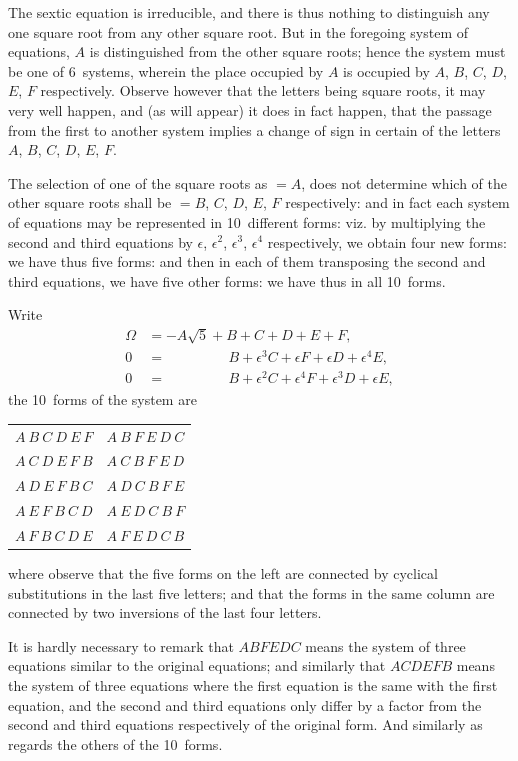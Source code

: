 \documentclass[11pt,a4paper]{book}
\begin{document}
The sextic equation is irreducible, and there is thus nothing to distinguish any one square root from any other square root. But in the foregoing system of equations, $A$ is distinguished from the other square roots; hence the system must be one of 6~systems, wherein the place occupied by $A$ is occupied by $A$, $B$, $C$, $D$, $E$, $F$ respectively. Observe however that the letters being square roots, it may very well happen, and (as will appear) it does in fact happen, that the passage from the first to another system implies a change of sign in certain of the letters $A$, $B$, $C$, $D$, $E$, $F$.

The selection of one of the square roots as $= A$, does not determine which of the other square roots shall be $= B$, $C$, $D$, $E$, $F$ respectively: and in fact each system of equations may be represented in 10~different forms: viz. by multiplying the second and third equations by $\epsilon$, $\epsilon^2$, $\epsilon^3$, $\epsilon^4$ respectively, we obtain four new forms: we have thus five forms: and then in each of them transposing the second and third equations, we have five other forms: we have thus in all 10~forms.

Write
\begin{align*}
\Omega &= -A\sqrt{5} + B + C + D + E + F, \\
0 &= \phantom{-A\sqrt{5} +}\, B + \epsilon^3 C + \epsilon F + \epsilon D + \epsilon^4 E, \\
0 &= \phantom{-A\sqrt{5} +}\, B + \epsilon^2 C + \epsilon^4 F + \epsilon^3 D + \epsilon E,
\end{align*}
the 10~forms of the system are
\begin{center}
\begin{tabular}{l|l}
$A\ B\ C\ D\ E\ F$ & $A\ B\ F\ E\ D\ C$ \\
$A\ C\ D\ E\ F\ B$ & $A\ C\ B\ F\ E\ D$ \\
$A\ D\ E\ F\ B\ C$ & $A\ D\ C\ B\ F\ E$ \\
$A\ E\ F\ B\ C\ D$ & $A\ E\ D\ C\ B\ F$ \\
$A\ F\ B\ C\ D\ E$ & $A\ F\ E\ D\ C\ B$
\end{tabular}
\end{center}
where observe that the five forms on the left are connected by cyclical substitutions in the last five letters; and that the forms in the same column are connected by two inversions of the last four letters.

It is hardly necessary to remark that $ABFEDC$ means the system of three equations similar to the original equations; and similarly that $ACDEFB$ means the system of three equations where the first equation is the same with the first equation, and the second and third equations only differ by a factor from the second and third equations respectively of the original form. And similarly as regards the others of the 10~forms.
\end{document}
